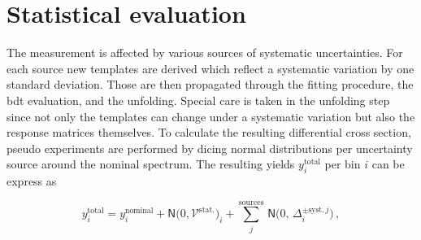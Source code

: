 

\section{Statistical evaluation}

The measurement is affected by various sources of systematic uncertainties. For each source new templates are derived which reflect a systematic variation by one standard deviation. Those are then propagated through the fitting procedure, the \gls{bdt} evaluation, and the unfolding. Special care is taken in the unfolding step since not only the templates can change under a systematic variation but also the response matrices themselves. To calculate the resulting differential cross section, pseudo experiments are performed by dicing normal distributions per uncertainty source around the nominal spectrum. The resulting yields $y_{i}^\mathrm{total}$ per bin $i$ can be express as

\begin{equation}
y_{i}^\mathrm{total}=y_{i}^\mathrm{nominal}+\mathsf{N}\Big(0,\mathcal{V}^\mathrm{stat.}\Big)_{i}+\sum_{j}^\mathrm{sources}\,\mathsf{N}\Big(0,\,\Delta^{\mathrm{\pm syst.\,}j}_{i}\Big)\,,
\end{equation}


